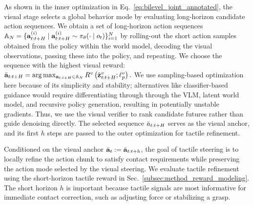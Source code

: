 As shown in the inner optimization in Eq.~\ref{eq:bilevel_joint_annotated}, the visual stage selects a global behavior mode by evaluating long-horizon candidate action sequences. We obtain a set of long-horizon action sequences
$
\mathbb{A}_N=\{\mathbf{a}_{t:t+H}^{(i)} \mid 
\mathbf{a}_{t:t+H}^{(i)} \sim \pi_\theta(\cdot \mid o_t)\}_{i=1}^{N}
$
by rolling-out the short action samples obtained from the policy within the world model, decoding the visual observations, passing these into the policy, and repeating. We choose the sequence with the highest visual reward:
$
\bar{\mathbf{a}}_{t:t+H}
=
\arg\max_{\mathbf{a}_{t:t+H} \in \mathbb{A}_N}
R^v
\left(
    \hat{\mathbf{z}}^v_{t:t+H}; \ell_p^v
\right).$
We use sampling-based optimization here because of its simplicity and stability; alternatives like classifier-based guidance would  
require differentiating through  through the VLM, latent world model, and recursive policy generation, resulting in potentially unstable gradients.  
Thus, we use the visual verifier to rank candidate futures rather than guide denoising directly. 
The selected sequence $\bar{a}_{t:t+H}$ serves as the visual anchor, and its first $h$ steps are passed to the outer optimization for tactile refinement.





Conditioned on the visual anchor $\bar{\mathbf{a}}_t :=\bar{\mathbf{a}}_{t:t+h}$, the goal of tactile steering is to locally refine the action chunk to satisfy contact requirements while preserving the action mode selected by the visual steering. We evaluate tactile refinement using the short-horizon tactile reward in Sec.~\ref{subsec:method_reward_modeling}. The short horizon $h$ is important because tactile signals are most informative for immediate contact correction, such as adjusting force or stabilizing a grasp.


